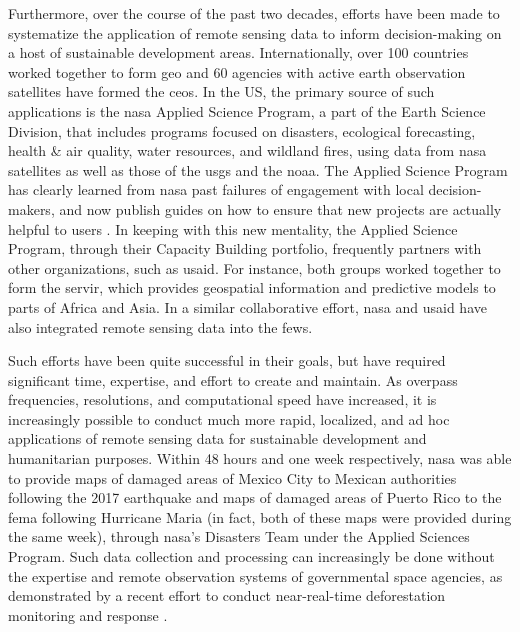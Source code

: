 \documentclass[notitlepage]{article}
\begin{document}
Furthermore, over the course of the past two decades, efforts have been made to systematize the application of remote sensing data to inform decision-making on a host of sustainable development areas. Internationally, over 100 countries worked together to form \ac{geo} and 60 agencies with active earth observation satellites have formed the \ac{ceos}. In the US, the primary source of such applications is the \ac{nasa} Applied Science Program, a part of the Earth Science Division, that includes programs focused on disasters, ecological forecasting, health \& air quality, water resources, and wildland fires, using data from \ac{nasa} satellites as well as those of the \ac{usgs} and the \ac{noaa}. The Applied Science Program has clearly learned from \ac{nasa} past failures of engagement with local decision-makers, and now publish guides on how to ensure that new projects are actually helpful to users \cite{irwinSERVIRServicePlanning2017}. In keeping with this new mentality, the Applied Science Program, through their Capacity Building portfolio, frequently partners with other organizations, such as \ac{usaid}. For instance, both groups worked together to form the \ac{servir}, which provides geospatial information and predictive models to parts of Africa and Asia. In a similar collaborative effort, \ac{nasa} and \ac{usaid} have also integrated remote sensing data into the \ac{fews}. 

Such efforts have been quite successful in their goals, but have required significant time, expertise, and effort to create and maintain. As overpass frequencies, resolutions, and computational speed have increased, it is increasingly possible to conduct much more rapid, localized, and ad hoc applications of remote sensing data for sustainable development and humanitarian purposes. Within 48 hours and one week respectively, \ac{nasa} was able to provide maps of damaged areas of Mexico City to Mexican authorities following the 2017 earthquake \cite{nasajetpropulsionlaboratorySatelliteRadarDetects2017} and maps of damaged areas of Puerto Rico to the \ac{fema} following Hurricane Maria \cite{nasajetpropulsionlaboratorySatelliteDataPuerto2017} (in fact, both of these maps were provided during the same week), through \ac{nasa}'s Disasters Team under the Applied Sciences Program. Such data collection and processing can increasingly be done without the expertise and remote observation systems of governmental space agencies, as demonstrated by a recent effort to conduct near-real-time deforestation monitoring and response \cite{finerCombatingDeforestationSatellite2018}.
\end{document}
